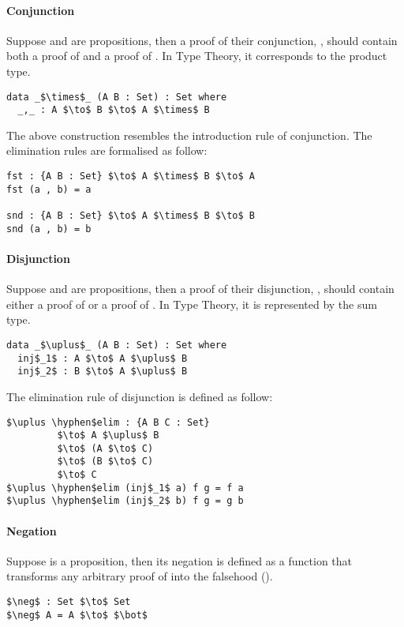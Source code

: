 \paragraph{Conjunction} Suppose  and  are propositions, then a
proof of their conjunction, , should contain both a proof of  and a proof
of . In Type Theory, it corresponds to the product type. 
\begin{lstlisting}[mathescape=true,xleftmargin=.3\textwidth]
data _$\times$_ (A B : Set) : Set where
  _,_ : A $\to$ B $\to$ A $\times$ B
\end{lstlisting} 

\par The above construction resembles the introduction rule of
conjunction. The elimination rules are formalised as follow:
\begin{lstlisting}[mathescape=true,xleftmargin=.3\textwidth]
fst : {A B : Set} $\to$ A $\times$ B $\to$ A
fst (a , b) = a

snd : {A B : Set} $\to$ A $\times$ B $\to$ B
snd (a , b) = b
\end{lstlisting} 

\paragraph{Disjunction} Suppose  and  are propositions, then a
proof of their disjunction, , should contain either a proof of  or a
proof of . In Type Theory, it is represented by the sum type. 
\begin{lstlisting}[mathescape=true,xleftmargin=.3\textwidth]
data _$\uplus$_ (A B : Set) : Set where
  inj$_1$ : A $\to$ A $\uplus$ B
  inj$_2$ : B $\to$ A $\uplus$ B
\end{lstlisting} 

\par The elimination rule of disjunction is defined as follow: 
\begin{lstlisting}[mathescape=true,xleftmargin=.3\textwidth]
$\uplus \hyphen$elim : {A B C : Set} 
         $\to$ A $\uplus$ B 
         $\to$ (A $\to$ C) 
         $\to$ (B $\to$ C) 
         $\to$ C
$\uplus \hyphen$elim (inj$_1$ a) f g = f a
$\uplus \hyphen$elim (inj$_2$ b) f g = g b
\end{lstlisting} 

\paragraph{Negation} Suppose  is a proposition, then its negation is
defined as a function that transforms any arbitrary proof of  into
the falsehood (\mb{\bot}). 
\begin{lstlisting}[mathescape=true,xleftmargin=.3\textwidth]
$\neg$ : Set $\to$ Set
$\neg$ A = A $\to$ $\bot$
\end{lstlisting} 


